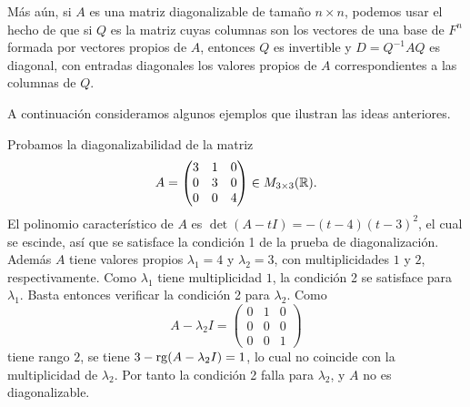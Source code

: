 \documentclass[12pt,a4paper]{book}
\begin{document}
    Más aún, si $A$ es una matriz diagonalizable de tamaño $n\times n$, podemos usar el hecho de que si $Q$ es la matriz cuyas columnas son los vectores de una base de $F^n$ formada por vectores propios de $A$, entonces $Q$ es invertible y $D=Q^{-1}AQ$ es diagonal, con entradas diagonales los valores propios de $A$ correspondientes a las columnas de $Q$.

    A continuación consideramos algunos ejemplos que ilustran las ideas anteriores.

    \begin{ejemplo}
        Probamos la diagonalizabilidad de la matriz
        \begin{equation*}
            A=\begin{pmatrix}3&1&0\\0&3&0\\0&0&4\end{pmatrix}\in M_{3\times 3}(\mathbb{R}).
        \end{equation*}
        El polinomio característico de $A$ es $\det(A-tI)=-(t-4)(t-3)^2$, el cual se escinde, así que se satisface la condición 1 de la prueba de diagonalización. Además $A$ tiene valores propios $\lambda_1=4$ y $\lambda_2=3$, con multiplicidades $1$ y $2$, respectivamente. Como $\lambda_1$ tiene multiplicidad $1$, la condición 2 se satisface para $\lambda_1$. Basta entonces verificar la condición 2 para $\lambda_2$. Como
        \begin{equation*}
            A-\lambda_2 I=\begin{pmatrix}0&1&0\\0&0&0\\0&0&1\end{pmatrix}
        \end{equation*}
        tiene rango $2$, se tiene $3-\operatorname{rg}(A-\lambda_2 I)=1$, lo cual no coincide con la multiplicidad de $\lambda_2$. Por tanto la condición 2 falla para $\lambda_2$, y $A$ no es diagonalizable.
    \end{ejemplo}
\end{document}
